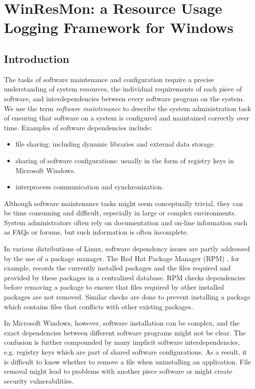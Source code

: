 \section{WinResMon: a Resource Usage Logging Framework for Windows}


\subsection{Introduction}

The tasks of software maintenance and configuration require a precise
understanding of system resources, the individual requirements of each piece
of software, and interdependencies between every software program on the
system.  We use the term {\em software maintenance} to describe the system
administration task of ensuring that software on a system is configured and
maintained correctly over time.  Examples of software dependencies include:

\begin{itemize}
\item file sharing: including dynamic libraries and external data storage.
\item sharing of software configurations: usually in the form of registry keys
in Microsoft Windows.
\item interprocess communication and synchronization.
\end{itemize}

Although software maintenance tasks might seem conceptually trivial, they can
be time consuming and difficult, especially in large or complex environments.
System administrators often rely on documentation and on-line information such
as FAQs or forums, but such information is often incomplete.

In various distributions of Linux, software dependency issues are partly
addressed by the use of a package manager.  The Red Hat Package Manager (RPM)
\cite{rpm}, for example, records the currently installed packages and the
files required and provided by these packages in a centralized database.  RPM
checks dependencies before removing a package to ensure that files required by
other installed packages are not removed.  Similar checks are done to prevent
installing a package which contains files that conflicts with other existing
packages.

In Microsoft Windows, however, software installation can be complex, and the
exact dependencies between different software programs might not be clear.
The confusion is further compounded by many implicit software
interdependencies, e.g. registry keys which are part of shared software
configurations.  As a result, it is difficult to know whether to remove a file
when uninstalling an application.  File removal might lead to problems with
another piece software or might create security vulnerabilities.  

